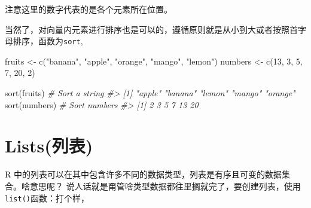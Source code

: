 \documentclass[
]{book}
\newenvironment{Shaded}{\begin{snugshade}}{\end{snugshade}}
\newcommand{\AttributeTok}[1]{\textcolor[rgb]{0.77,0.63,0.00}{#1}}
\newcommand{\CommentTok}[1]{\textcolor[rgb]{0.56,0.35,0.01}{\textit{#1}}}
\newcommand{\ConstantTok}[1]{\textcolor[rgb]{0.00,0.00,0.00}{#1}}
\newcommand{\DecValTok}[1]{\textcolor[rgb]{0.00,0.00,0.81}{#1}}
\newcommand{\FunctionTok}[1]{\textcolor[rgb]{0.00,0.00,0.00}{#1}}
\newcommand{\NormalTok}[1]{#1}
\newcommand{\OtherTok}[1]{\textcolor[rgb]{0.56,0.35,0.01}{#1}}
\newcommand{\StringTok}[1]{\textcolor[rgb]{0.31,0.60,0.02}{#1}}
\begin{document}
注意这里的数字代表的是各个元素所在位置。

当然了，对向量内元素进行排序也是可以的，遵循原则就是从小到大或者按照首字母排序，函数为\texttt{sort},

\begin{Shaded}
\begin{Highlighting}[]
\NormalTok{fruits }\OtherTok{\textless{}{-}} \FunctionTok{c}\NormalTok{(}\StringTok{"banana"}\NormalTok{, }\StringTok{"apple"}\NormalTok{, }\StringTok{"orange"}\NormalTok{, }\StringTok{"mango"}\NormalTok{, }\StringTok{"lemon"}\NormalTok{)}
\NormalTok{numbers }\OtherTok{\textless{}{-}} \FunctionTok{c}\NormalTok{(}\DecValTok{13}\NormalTok{, }\DecValTok{3}\NormalTok{, }\DecValTok{5}\NormalTok{, }\DecValTok{7}\NormalTok{, }\DecValTok{20}\NormalTok{, }\DecValTok{2}\NormalTok{)}

\FunctionTok{sort}\NormalTok{(fruits)  }\CommentTok{\# Sort a string}
\CommentTok{\#\textgreater{} [1] "apple"  "banana" "lemon"  "mango"  "orange"}
\FunctionTok{sort}\NormalTok{(numbers) }\CommentTok{\# Sort numbers}
\CommentTok{\#\textgreater{} [1]  2  3  5  7 13 20}
\end{Highlighting}
\end{Shaded}

\hypertarget{listsux5217ux8868}{%
\section{Lists(列表)}\label{listsux5217ux8868}}

R 中的列表可以在其中包含许多不同的数据类型，列表是有序且可变的数据集合。啥意思呢？
说人话就是甭管啥类型数据都往里搁就完了，要创建列表，使用\texttt{list()}函数：打个样，

\begin{Shaded}
\end{Shaded}
\end{document}

